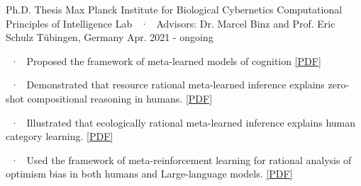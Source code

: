 \begin{cventries}
\vspace{2mm}

    \cventryLab
    {Ph.D. Thesis}
    {Max Planck Institute for Biological Cybernetics } %
    {Computational Principles of Intelligence Lab ~·~ Advisors: Dr. Marcel Binz and Prof. Eric Schulz}%
    {Tübingen, Germany} %
    {Apr. 2021 - ongoing}
    {%
    \begin{cvitems}
     \item ~·~  Proposed the framework of meta-learned models of cognition \href{https://arxiv.org/abs/2304.06729}{[PDF]}
     \item ~·~  Demonstrated that resource rational meta-learned inference explains zero-shot compositional reasoning in humans. \href{https://osf.io/preprints/psyarxiv/ymve5}{[PDF]}
      \item ~·~ Illustrated that ecologically rational meta-learned inference explains human category learning. \href{https://arxiv.org/abs/2402.01821}{[PDF]}
      \item ~·~ Used the framework of meta-reinforcement learning for rational analysis of optimism bias in both humans and Large-language models. \href{https://arxiv.org/abs/2402.03969}{[PDF]}
    \end{cvitems}
    }



\end{cventries}
